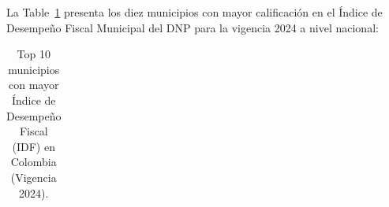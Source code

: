 \documentclass[
  10pt,
  letterpaper,
  DIV=11,
  numbers=noendperiod]{scrartcl}
\begin{document}
La Table~\ref{tbl-top10-mpios-nacional} presenta los diez municipios con
mayor calificación en el Índice de Desempeño Fiscal Municipal del DNP
para la vigencia 2024 a nivel nacional:

\begin{longtable}[]{@{}
  >{\centering\arraybackslash}p{}
  >{\centering\arraybackslash}p{}
  >{\raggedright\arraybackslash}p{}
  >{\raggedright\arraybackslash}p{}
  >{\raggedleft\arraybackslash}p{}
  >{\raggedright\arraybackslash}p{}
  >{\raggedleft\arraybackslash}p{}@{}}

\caption{\label{tbl-top10-mpios-nacional}Top 10 municipios con mayor
Índice de Desempeño Fiscal (IDF) en Colombia (Vigencia 2024).}

\tabularnewline


\end{longtable}
\end{document}
